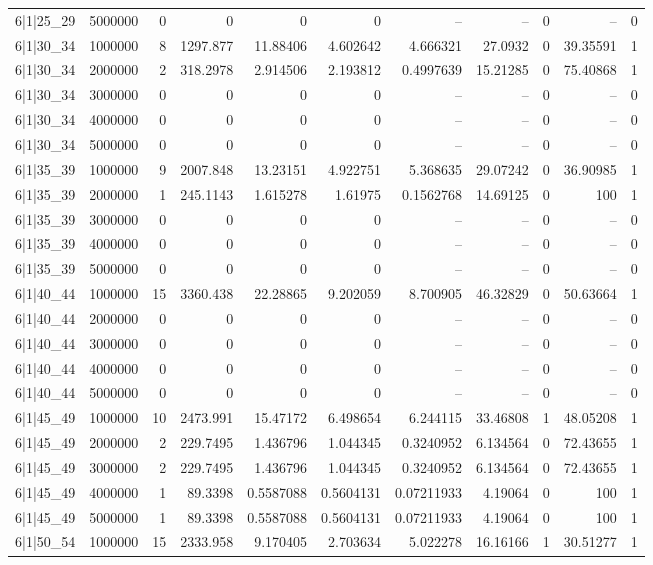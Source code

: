 \begin{tabular}{lrrrrrrrrrr}
6|1|25\_29 & 5000000 & 0 & 0 & 0 & 0 & -- & -- & 0 & -- & 0 \\
6|1|30\_34 & 1000000 & 8 & 1297.877 & 11.88406 & 4.602642 & 4.666321 & 27.0932 & 0 & 39.35591 & 1 \\
6|1|30\_34 & 2000000 & 2 & 318.2978 & 2.914506 & 2.193812 & 0.4997639 & 15.21285 & 0 & 75.40868 & 1 \\
6|1|30\_34 & 3000000 & 0 & 0 & 0 & 0 & -- & -- & 0 & -- & 0 \\
6|1|30\_34 & 4000000 & 0 & 0 & 0 & 0 & -- & -- & 0 & -- & 0 \\
6|1|30\_34 & 5000000 & 0 & 0 & 0 & 0 & -- & -- & 0 & -- & 0 \\
6|1|35\_39 & 1000000 & 9 & 2007.848 & 13.23151 & 4.922751 & 5.368635 & 29.07242 & 0 & 36.90985 & 1 \\
6|1|35\_39 & 2000000 & 1 & 245.1143 & 1.615278 & 1.61975 & 0.1562768 & 14.69125 & 0 & 100 & 1 \\
6|1|35\_39 & 3000000 & 0 & 0 & 0 & 0 & -- & -- & 0 & -- & 0 \\
6|1|35\_39 & 4000000 & 0 & 0 & 0 & 0 & -- & -- & 0 & -- & 0 \\
6|1|35\_39 & 5000000 & 0 & 0 & 0 & 0 & -- & -- & 0 & -- & 0 \\
6|1|40\_44 & 1000000 & 15 & 3360.438 & 22.28865 & 9.202059 & 8.700905 & 46.32829 & 0 & 50.63664 & 1 \\
6|1|40\_44 & 2000000 & 0 & 0 & 0 & 0 & -- & -- & 0 & -- & 0 \\
6|1|40\_44 & 3000000 & 0 & 0 & 0 & 0 & -- & -- & 0 & -- & 0 \\
6|1|40\_44 & 4000000 & 0 & 0 & 0 & 0 & -- & -- & 0 & -- & 0 \\
6|1|40\_44 & 5000000 & 0 & 0 & 0 & 0 & -- & -- & 0 & -- & 0 \\
6|1|45\_49 & 1000000 & 10 & 2473.991 & 15.47172 & 6.498654 & 6.244115 & 33.46808 & 1 & 48.05208 & 1 \\
6|1|45\_49 & 2000000 & 2 & 229.7495 & 1.436796 & 1.044345 & 0.3240952 & 6.134564 & 0 & 72.43655 & 1 \\
6|1|45\_49 & 3000000 & 2 & 229.7495 & 1.436796 & 1.044345 & 0.3240952 & 6.134564 & 0 & 72.43655 & 1 \\
6|1|45\_49 & 4000000 & 1 & 89.3398 & 0.5587088 & 0.5604131 & 0.07211933 & 4.19064 & 0 & 100 & 1 \\
6|1|45\_49 & 5000000 & 1 & 89.3398 & 0.5587088 & 0.5604131 & 0.07211933 & 4.19064 & 0 & 100 & 1 \\
6|1|50\_54 & 1000000 & 15 & 2333.958 & 9.170405 & 2.703634 & 5.022278 & 16.16166 & 1 & 30.51277 & 1 \\

\end{tabular}
